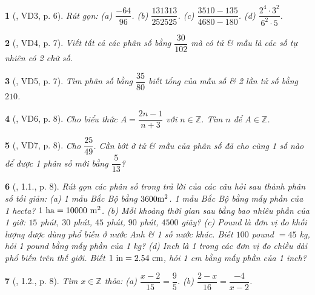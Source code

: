 \documentclass{article}
\newtheorem{baitoan}{}
\begin{document}
\begin{baitoan}[\cite{Binh_boi_duong_Toan_6_tap_2}, VD3, p. 6]
	Rút gọn: (a) $\dfrac{-64}{96}$. (b) $\dfrac{131313}{252525}$. (c) $\dfrac{3510 - 135}{4680 - 180}$. (d) $\dfrac{2^4\cdot3^2}{6^2\cdot5}$.
\end{baitoan}

\begin{baitoan}[\cite{Binh_boi_duong_Toan_6_tap_2}, VD4, p. 7]
	Viết tất cả các phân số bằng $ \dfrac{30}{102}$ mà có tử \& mẫu là các số tự nhiên có 2 chữ số.
\end{baitoan}

\begin{baitoan}[\cite{Binh_boi_duong_Toan_6_tap_2}, VD5, p. 7]
	Tìm phân số bằng $\dfrac{35}{80}$ biết tổng của mẫu số \& 2 lần tử số bằng $210$.
\end{baitoan}

\begin{baitoan}[\cite{Binh_boi_duong_Toan_6_tap_2}, VD6, p. 8]
	Cho biểu thức $A = \dfrac{2n - 1}{n + 3}$ với $n\in\mathbb{Z}$. Tìm $n$ để $A\in\mathbb{Z}$.
\end{baitoan}

\begin{baitoan}[\cite{Binh_boi_duong_Toan_6_tap_2}, VD7, p. 8]
	Cho $\dfrac{25}{49}$. Cần bớt ở tử \& mẫu của phân số đã cho cùng 1 số nào để được 1 phân số mới bằng $\dfrac{5}{13}$?
\end{baitoan}

\begin{baitoan}[\cite{Binh_boi_duong_Toan_6_tap_2}, 1.1., p. 8]
	Rút gọn các phân số trong trả lời của các câu hỏi sau thành phân số tối giản: (a) 1 mẫu Bắc Bộ bằng $\rm3600 m^2$. 1 mẫu Bắc Bộ bằng mấy phần của 1 hecta? $\rm1\ ha = 10000\ m^2$. (b) Mỗi khoảng thời gian sau bằng bao nhiêu phần của 1 giờ: $15$ phút, $30$ phút, $45$ phút, $90$ phút, $4500$ giây? (c) Pound là đơn vị đo khối lượng được dùng phổ biến ở nước Anh \& 1 số nước khác. Biết $100$ pound $= 45$ {\rm kg}, hỏi 1 pound bằng mấy phần của {\rm1 kg}? (d) Inch là 1 trong các đơn vị đo chiều dài phổ biến trên thế giới. Biết $\rm1\ in = 2.54\ cm$, hỏi {\rm1 cm} bằng mấy phần của {\rm1 inch}?
\end{baitoan}

\begin{baitoan}[\cite{Binh_boi_duong_Toan_6_tap_2}, 1.2., p. 8]
	Tìm $x\in\mathbb{Z}$ thỏa: (a) $\dfrac{x - 2}{15} = \dfrac{9}{5}$. (b) $\dfrac{2 - x}{16} = \dfrac{-4}{x - 2}$.
\end{baitoan}
\end{document}
